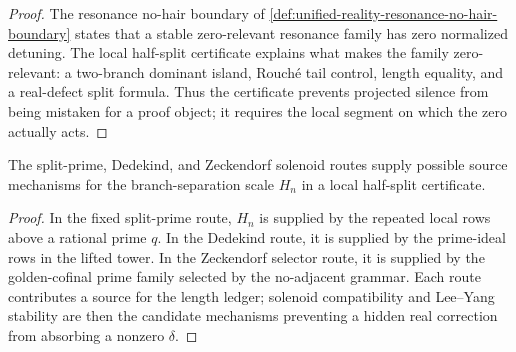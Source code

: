 \begin{proof}
The resonance no-hair boundary of
\autoref{def:unified-reality-resonance-no-hair-boundary} states that a
stable zero-relevant resonance family has zero normalized detuning.  The
local half-split certificate explains what makes the family
zero-relevant: a two-branch dominant island, Rouch\'e tail control,
length equality, and a real-defect split formula.  Thus the certificate
prevents projected silence from being mistaken for a proof object; it
requires the local segment on which the zero actually acts.
\end{proof}

\begin{corollary}
\label{cor:unified-reality-local-half-split-relation-to-solenoid-selector-routes}
The split-prime, Dedekind, and Zeckendorf solenoid routes supply possible
source mechanisms for the branch-separation scale $H_n$ in a local
half-split certificate.
\end{corollary}

\begin{proof}
In the fixed split-prime route, $H_n$ is supplied by the repeated local
rows above a rational prime $q$.  In the Dedekind route, it is supplied
by the prime-ideal rows in the lifted tower.  In the Zeckendorf selector
route, it is supplied by the golden-cofinal prime family selected by the
no-adjacent grammar.  Each route contributes a source for the length
ledger; solenoid compatibility and Lee--Yang stability are then the
candidate mechanisms preventing a hidden real correction from absorbing
a nonzero $\delta$.
\end{proof}
